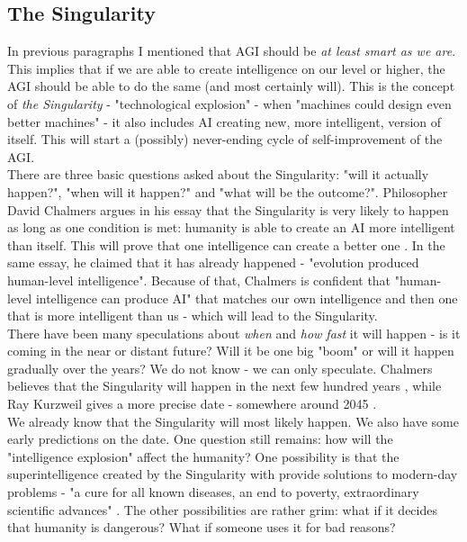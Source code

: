 \documentclass[12pt]{article}
\begin{document}
\subsection{The Singularity}
	In previous paragraphs I mentioned that AGI should be \emph{at least smart as we are}. This implies that if we are able to create intelligence on our level or higher, the AGI should be able to do the same (and most certainly will). This is the concept of \emph{the Singularity} - "technological explosion" - when "machines could design even better machines" \cite{singularity:1} - it also includes AI creating new, more intelligent, version of itself. This will start a (possibly) never-ending cycle of self-improvement of the AGI. 
	\\There are three basic questions asked about the Singularity: "will it actually happen?", "when will it happen?" and "what will be the outcome?". Philosopher David Chalmers argues in his essay that the Singularity is very likely to happen as long as one condition is met: humanity is able to create an AI more intelligent than itself. This will prove that one intelligence can create a better one \cite{singularity:3}. In the same essay, he claimed that it has already happened - "evolution produced human-level intelligence". Because of that, Chalmers is confident that "human-level intelligence can produce AI" \cite{singularity:3} that matches our own intelligence and then one that is more intelligent than us - which will lead to the Singularity. 
	\\There have been many speculations about \emph{when} and \emph{how fast} it will happen - is it coming in the near or distant future? Will it be one big "boom" or will it happen gradually over the years? We do not know - we can only speculate. Chalmers believes that the Singularity will happen in the next few hundred years \cite{singularity:2}\cite{singularity:3}, while Ray Kurzweil gives a more precise date - somewhere around 2045 \cite{singularity:2}\cite{singularity:4}.
	\\We already know that the Singularity will most likely happen. We also have some early predictions on the date. One question still remains: how will the "intelligence explosion" affect the humanity? One possibility is that the superintelligence created by the Singularity with provide solutions to modern-day problems - "a cure for all known diseases, an end to poverty, extraordinary scientific advances" \cite{singularity:3}. The other possibilities are rather grim: what if it decides that humanity is dangerous? What if someone uses it for bad reasons? 
\end{document}
